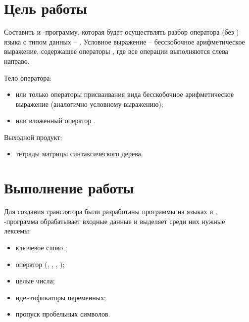 





\tableofcontents
\newpage

\section{Цель работы}

Составить  и -программу, которая будет осуществлять разбор оператора  (без ) языка  с типом данных -- . Условное выражение -- бесскобочное арифметическое выражение, содержащее операторы \code{+ - * /}, где все операции выполняются слева направо. 

\noindent Тело оператора:

\begin{itemize}
	\item или только операторы присваивания вида  бесскобочное арифметическое выражение (аналогично условному выражению);
	\item или вложенный оператор .
\end{itemize}

\noindent Выходной продукт:

\begin{itemize}
	\item тетрады матрицы синтаксического дерева.
\end{itemize}

\section{Выполнение работы}

Для создания транслятора были разработаны программы на языках  и . -программа обрабатывает входные данные и выделяет среди них нужные лексемы:

\begin{itemize}
	\item ключевое слово ;
	\item оператор (\code{+}, \code{-}, \code{*}, \code{/});
	\item целые числа;
	\item идентификаторы переменных;
	\item пропуск пробельных символов.
\end{itemize}


